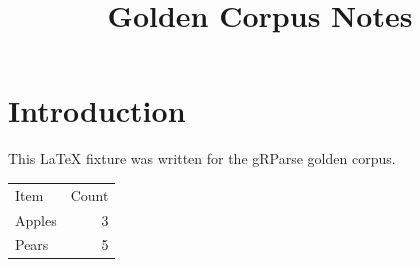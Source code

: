 \documentclass{article}
\title{Golden Corpus Notes}
\begin{document}
\maketitle
\section{Introduction}
This \LaTeX{} fixture was written for the gRParse golden corpus.
\begin{tabular}{lr}
Item & Count \\
Apples & 3 \\
Pears & 5 \\
\end{tabular}
\end{document}
